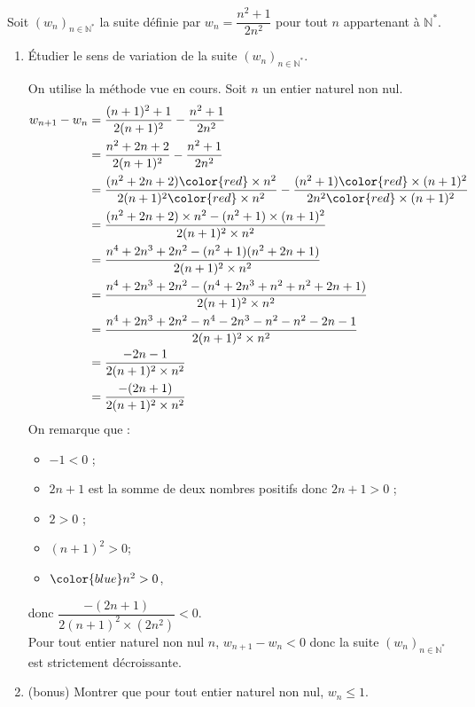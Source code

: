 \documentclass[a4paper,dvipsnames]{article}
\newcommand{\wns}{\left(w_n\right)_{n\in\mathbb{N}^\ast}}
\newcommand{\N}{\mathbb{N}}
\newenvironment{correction}{\color{blue}}{}
\begin{document}
\begin{exercice}[breakable]{}{}
  Soit $\wns$ la suite définie par $w_n=\dfrac{n^2+1}{2n^2}$ pour tout $n$ appartenant à $\N^\ast$.
  \begin{enumerate}
    \item Étudier le sens de variation de la suite $\wns$.

      \begin{correction}
	On utilise la méthode vue en cours. Soit $n$ un entier naturel non nul.  
	\[
	  \begin{aligned}
	    w_{n+1}-w_n &= \dfrac{(n+1)^2+1}{2(n+1)^2}-\dfrac{n^2+1}{2n^2}\\
			&= \dfrac{n^2+2n+2}{2(n+1)^2}-\dfrac{n^2+1}{2n^2}\\
			&= \dfrac{(n^2+2n+2){\color{red}\times n^2}}{2(n+1)^2{\color{red}\times n^2}}-\dfrac{(n^2+1){\color{red}\times(n+1)^2}}{2n^2{\color{red}\times(n+1)^2}}\\
			&= \dfrac{(n^2+2n+2)\times n^2-(n^2+1)\times(n+1)^2}{2(n+1)^2\times n^2}\\
			&= \dfrac{n^4+2n^3+2n^2-(n^2+1)(n^2+2n+1)}{2(n+1)^2\times n^2}\\
			&= \dfrac{n^4+2n^3+2n^2-(n^4+2n^3+n^2+n^2+2n+1)}{2(n+1)^2\times n^2}\\
			&= \dfrac{n^4+2n^3+2n^2-n^4-2n^3-n^2-n^2-2n-1}{2(n+1)^2\times n^2}\\
			&= \dfrac{-2n-1}{2(n+1)^2\times n^2}\\
			&= \dfrac{-(2n+1)}{2(n+1)^2\times n^2}
	  \end{aligned}
	\]
	On remarque que :
        \begin{itemize}
          \item $-1<0$ ;
	  \item $2n+1$ est la somme de deux nombres positifs donc $2n+1>0$ ;
	  \item $2>0$ ;
	  \item $(n+1)^2>0$;
	  \item $\color{blue}n^2>0$,
        \end{itemize}

	\vphantom{1}\color{blue}donc $\dfrac{-(2n+1)}{2(n+1)^2\times(2n^2)}<0$.\\
	Pour tout entier naturel non nul $n$, $w_{n+1}-w_n<0$ donc la suite $\wns$ est strictement décroissante.
      \end{correction}
      
    \item (bonus) Montrer que pour tout entier naturel non nul, $w_n\leq 1$.


\end{enumerate}
\end{exercice}
\end{document}
